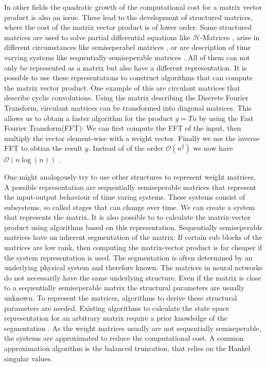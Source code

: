 \documentclass[doctype=mastersthesis,BCOR=15mm,biblatex]{ldvbook}%
\newcommand{\bigO}{\mathscr{O}}
\begin{document}
In other fields the quadratic growth of the computational cost for a matrix vector product is also an issue.
These lead to the development of structured matrices, where the cost of the matrix vector product is of lower order.
Some structured matrices are used to solve partial differential equations like $\mathcal{H}$-Matrices \cite{grasedyck_theorie_2001}, arise in different circumstances like semiseperabel matrices \cite{vandebril_bibliography_2005}, 
or are description of time varying systems like sequentially semiseperable matrices \cite{dewilde_time-varying_1998}.
All of them can not only be represented as a matrix but also have a different representation.
It is possible to use these representations to construct algorithms that can compute the matrix vector product.
One example of this are circulant matrices that describe cyclic convolutions.
Using the matrix describing the Discrete Fourier Transform, circulant matrices can be transformed into diagonal matrices.
This allows us to obtain a faster algorithm for the product $y=Tu$ by using the Fast Fourier Transform(FFT):
We can first compute the FFT of the input, then multiply the vector element-wise with a weight vector. Finally we use the inverse FFT to obtian the result $y$.
Instead of of the order $\bigO(n^2)$ we now have $\bigO(n\log(n))$ \cite{strang_computational_2007}.

One might analogously try to use other structures to represent weight matrices.
A possible representation are sequentially semiseperable matrices that represent the input-output behaviour of time varing systems.
These systems consist of subsystems, so called stages that can change over time.
We can create a system that represents the matrix.
It is also possible to to calculate the matrix-vector product using algorithms based on this representation.
Sequentially semiseperable matrices have an inherent segmentation of the matrix.
If certain sub blocks of the matrices are low rank, then computing the matrix-vector product is far cheaper if the system representation is used.
The segmentation is often determined by an underlying physical system and therefore known. 
The matrices in neural networks do not necessarily have the same underlying structure.
Even if the matrix is close to a sequentially semiseperable matrix the structural parameters are usually unknown.
To represent the matrices, algorithms to derive these structural parameters are needed.
Existing algorithms to calculate the state space representation for an arbitrary matrix require a prior knowledge of the segmentation \cite{chandrasekaran_fast_2002}.
As the weight matrices usually are not sequentially semiseperable, the systems are approximated to reduce the computational cost.
A common approximation algorithm is the balanced truncation, that relies on the Hankel singular values.
\end{document}
